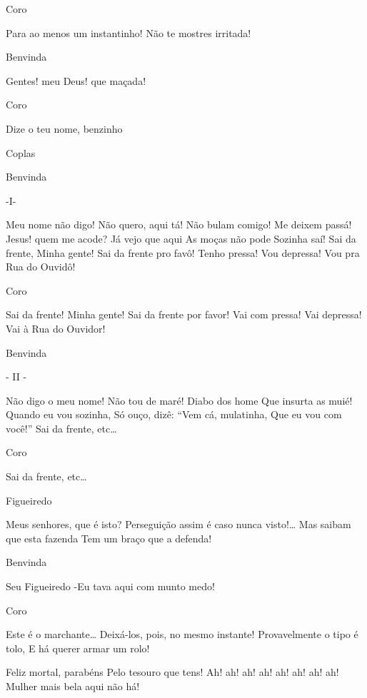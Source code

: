  Coro

 Para ao menos um instantinho!
 Não te mostres irritada!

 Benvinda

 Gentes! meu Deus! que maçada!

 Coro

 Dize o teu nome, benzinho

 Coplas

 Benvinda

 -I-

 Meu nome não digo!
 Não quero, aqui tá!
 Não bulam comigo!
 Me deixem passá!
 Jesus! quem me acode?
 Já vejo que aqui
 As moças não pode
 Sozinha saí!
 Sai da frente,
 Minha gente!
 Sai da frente pro favô!
 Tenho pressa!
 Vou depressa!
 Vou pra Rua do Ouvidô!

 Coro

 Sai da frente!
 Minha gente!
 Sai da frente por favor!
 Vai com pressa!
 Vai depressa!
 Vai à Rua do Ouvidor!

 Benvinda

 - II -

 Não digo o meu nome!
 Não tou de maré!
 Diabo dos home
 Que insurta as muié!
 Quando eu vou sozinha,
 Só ouço, dizê:
 “Vem cá, mulatinha,
 Que eu vou com você!”
 Sai da frente, etc\ldots{}

 Coro

 Sai da frente, etc\ldots{}
 

 Figueiredo

 Meus senhores, que é isto?
 Perseguição assim é caso nunca visto!\ldots{}
 Mas saibam que esta fazenda
 Tem um braço que a defenda!

 Benvinda

 Seu Figueiredo
 -Eu tava aqui com munto medo!

 Coro

\repl{} 
 Este é o marchante\ldots{}
 Deixá-los, pois, no mesmo instante!
 Provavelmente o tipo é tolo,
 E há querer armar um rolo!


 Feliz mortal, parabéns
 Pelo tesouro que tens!
 Ah! ah! ah! ah! ah! ah! ah! ah!
 Mulher mais bela aqui não há!




